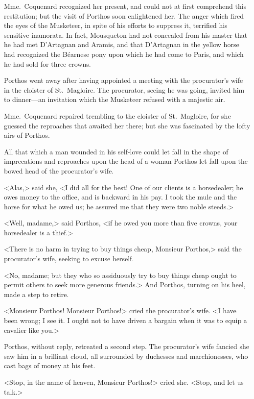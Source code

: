Mme.~Coquenard recognized her present, and could not at first comprehend this restitution; but the visit of Porthos soon enlightened her. The anger which fired the eyes of the Musketeer, in spite of his efforts to suppress it, terrified his sensitive inamorata. In fact, Mousqueton had not concealed from his master that he had met D'Artagnan and Aramis, and that D'Artagnan in the yellow horse had recognized the Béarnese pony upon which he had come to Paris, and which he had sold for three crowns. 

Porthos went away after having appointed a meeting with the procurator's wife in the cloister of St.~Magloire. The procurator, seeing he was going, invited him to dinner—an invitation which the Musketeer refused with a majestic air. 

Mme.~Coquenard repaired trembling to the cloister of St.~Magloire, for she guessed the reproaches that awaited her there; but she was fascinated by the lofty airs of Porthos. 

All that which a man wounded in his self-love could let fall in the shape of imprecations and reproaches upon the head of a woman Porthos let fall upon the bowed head of the procurator's wife. 

<Alas,> said she, <I did all for the best! One of our clients is a horsedealer; he owes money to the office, and is backward in his pay. I took the mule and the horse for what he owed us; he assured me that they were two noble steeds.> 

<Well, madame,> said Porthos, <if he owed you more than five crowns, your horsedealer is a thief.> 

<There is no harm in trying to buy things cheap, Monsieur Porthos,> said the procurator's wife, seeking to excuse herself. 

<No, madame; but they who so assiduously try to buy things cheap ought to permit others to seek more generous friends.> And Porthos, turning on his heel, made a step to retire. 

<Monsieur Porthos! Monsieur Porthos!> cried the procurator's wife. <I have been wrong; I see it. I ought not to have driven a bargain when it was to equip a cavalier like you.> 

Porthos, without reply, retreated a second step. The procurator's wife fancied she saw him in a brilliant cloud, all surrounded by duchesses and marchionesses, who cast bags of money at his feet. 

<Stop, in the name of heaven, Monsieur Porthos!> cried she. <Stop, and let us talk.> 


